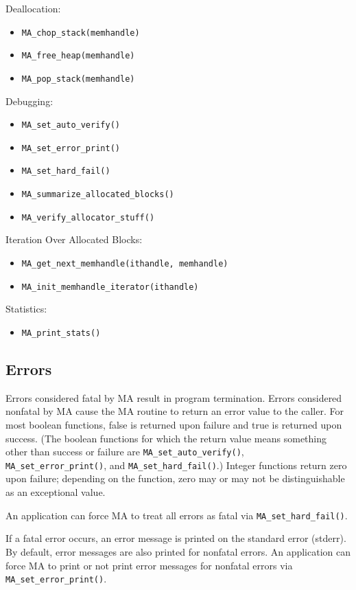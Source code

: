 Deallocation:
\begin{itemize}
\item {\tt MA\_chop\_stack(memhandle)}
\item {\tt MA\_free\_heap(memhandle)}
\item {\tt MA\_pop\_stack(memhandle)}
\end{itemize}

Debugging:
\begin{itemize}
\item {\tt MA\_set\_auto\_verify()}
\item {\tt MA\_set\_error\_print()}
\item {\tt MA\_set\_hard\_fail()}
\item {\tt MA\_summarize\_allocated\_blocks()}
\item {\tt MA\_verify\_allocator\_stuff()}
\end{itemize}

Iteration Over Allocated Blocks:
\begin{itemize}
\item {\tt MA\_get\_next\_memhandle(ithandle, memhandle)}
\item {\tt MA\_init\_memhandle\_iterator(ithandle)}
\end{itemize}

Statistics:
\begin{itemize}
\item {\tt MA\_print\_stats()}
\end{itemize}


\subsection{Errors}

Errors considered fatal by MA result in program termination.  Errors
considered nonfatal by MA cause the MA routine to return an error
value to the caller.  For most boolean functions, false is returned
upon failure and true is returned upon success.  (The boolean
functions for which the return value means something other than
success or failure are {\tt MA\_set\_auto\_verify()}, {\tt
  MA\_set\_error\_print()}, and {\tt MA\_set\_hard\_fail()}.)  Integer
functions return zero upon failure; depending on the function, zero
may or may not be distinguishable as an exceptional value.

An application can force MA to treat all errors as fatal via
{\tt MA\_set\_hard\_fail()}.

If a fatal error occurs, an error message is printed on the standard
error (stderr).  By default, error messages are also printed for
nonfatal errors.  An application can force MA to print or not print
error messages for nonfatal errors via {\tt MA\_set\_error\_print()}.

